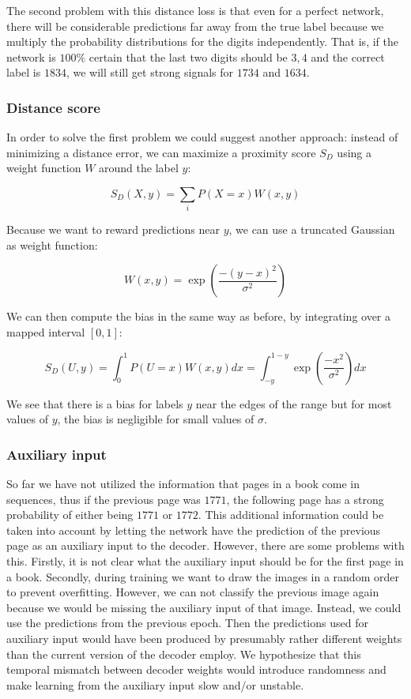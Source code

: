 The second problem with this distance loss is that even for a perfect network, there will be considerable predictions far away from the true label because we multiply the probability distributions for the digits independently. That is, if the network is $100\%$ certain that the last two digits should be $3, 4$ and the correct label is $1834$, we will still get strong signals for $1734$ and $1634$.

\subsubsection{Distance score}

In order to solve the first problem we could suggest another approach: instead of minimizing a distance error, we can maximize a proximity score $S_D$ using a weight function $W$ around the label $y$:

\[
S_D(X, y) = \sum_i P(X=x) W(x, y)
\]

Because we want to reward predictions near $y$, we can use a truncated Gaussian as weight function:

\[
W(x, y) = \exp \left( \frac{-(y-x)^2}{\sigma^2} \right)
\]

We can then compute the bias in the same way as before, by integrating over a mapped interval $[0,1]$:

\[
S_D(U, y) = \int_0^1 P(U=x) W(x, y) dx =
\int_{-y}^{1-y} \exp \left( \frac{-x^2}{\sigma^2} \right) dx
\]

We see that there is a bias for labels $y$ near the edges of the range but for most values of $y$, the bias is negligible for small values of $\sigma$.

\subsubsection{Auxiliary input}

So far we have not utilized the information that pages in a book come in sequences, thus if the previous page was $1771$, the following page has a strong probability of either being $1771$ or $1772$. This additional information could be taken into account by letting the network have the prediction of the previous page as an auxiliary input to the decoder. However, there are some problems with this. Firstly, it is not clear what the auxiliary input should be for the first page in a book. Secondly, during training we want to draw the images in a random order to prevent overfitting. However, we can not classify the previous image again because we would be missing the auxiliary input of that image. Instead, we could use the predictions from the previous epoch. Then the predictions used for auxiliary input would have been produced by presumably rather different weights than the current version of the decoder employ. We hypothesize that this temporal mismatch between decoder weights would introduce randomness and make learning from the auxiliary input slow and/or unstable.

